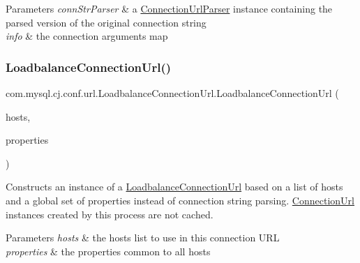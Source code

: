 \begin{DoxyParams}{Parameters}
{\em conn\+Str\+Parser} & a \mbox{\hyperlink{classcom_1_1mysql_1_1cj_1_1conf_1_1_connection_url_parser}{Connection\+Url\+Parser}} instance containing the parsed version of the original connection string \\
\hline
{\em info} & the connection arguments map \\
\hline
\end{DoxyParams}
\mbox{\label{classcom_1_1mysql_1_1cj_1_1conf_1_1url_1_1_loadbalance_connection_url_a8e0a1ab2578683671fdad2dea60f78cc}} 
\subsubsection{\texorpdfstring{Loadbalance\+Connection\+Url()}{LoadbalanceConnectionUrl()}\hspace{0.1cm}{\footnotesize\ttfamily [2/2]}}
{\footnotesize\ttfamily com.\+mysql.\+cj.\+conf.\+url.\+Loadbalance\+Connection\+Url.\+Loadbalance\+Connection\+Url (\begin{DoxyParamCaption}\item[{List$<$ \mbox{\hyperlink{classcom_1_1mysql_1_1cj_1_1conf_1_1_host_info}{Host\+Info}} $>$}]{hosts,  }\item[{Map$<$ String, String $>$}]{properties }\end{DoxyParamCaption})}

Constructs an instance of a \mbox{\hyperlink{classcom_1_1mysql_1_1cj_1_1conf_1_1url_1_1_loadbalance_connection_url}{Loadbalance\+Connection\+Url}} based on a list of hosts and a global set of properties instead of connection string parsing. \mbox{\hyperlink{classcom_1_1mysql_1_1cj_1_1conf_1_1_connection_url}{Connection\+Url}} instances created by this process are not cached.


\begin{DoxyParams}{Parameters}
{\em hosts} & the hosts list to use in this connection U\+RL \\
\hline
{\em properties} & the properties common to all hosts \\
\hline
\end{DoxyParams}


